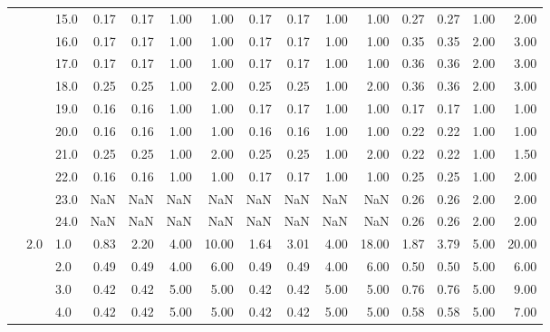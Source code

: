 \begin{tabular}{lllrrrrrrrrrrrr}
       &     & 15.0 &       0.17 &      0.17 & 1.00 &   1.00 &       0.17 &      0.17 &  1.00 &   1.00 &       0.27 &      0.27 &  1.00 &   2.00 \\
       &     & 16.0 &       0.17 &      0.17 & 1.00 &   1.00 &       0.17 &      0.17 &  1.00 &   1.00 &       0.35 &      0.35 &  2.00 &   3.00 \\
       &     & 17.0 &       0.17 &      0.17 & 1.00 &   1.00 &       0.17 &      0.17 &  1.00 &   1.00 &       0.36 &      0.36 &  2.00 &   3.00 \\
       &     & 18.0 &       0.25 &      0.25 & 1.00 &   2.00 &       0.25 &      0.25 &  1.00 &   2.00 &       0.36 &      0.36 &  2.00 &   3.00 \\
       &     & 19.0 &       0.16 &      0.16 & 1.00 &   1.00 &       0.17 &      0.17 &  1.00 &   1.00 &       0.17 &      0.17 &  1.00 &   1.00 \\
       &     & 20.0 &       0.16 &      0.16 & 1.00 &   1.00 &       0.16 &      0.16 &  1.00 &   1.00 &       0.22 &      0.22 &  1.00 &   1.00 \\
       &     & 21.0 &       0.25 &      0.25 & 1.00 &   2.00 &       0.25 &      0.25 &  1.00 &   2.00 &       0.22 &      0.22 &  1.00 &   1.50 \\
       &     & 22.0 &       0.16 &      0.16 & 1.00 &   1.00 &       0.17 &      0.17 &  1.00 &   1.00 &       0.25 &      0.25 &  1.00 &   2.00 \\
       &     & 23.0 &        NaN &       NaN &  NaN &    NaN &        NaN &       NaN &   NaN &    NaN &       0.26 &      0.26 &  2.00 &   2.00 \\
       &     & 24.0 &        NaN &       NaN &  NaN &    NaN &        NaN &       NaN &   NaN &    NaN &       0.26 &      0.26 &  2.00 &   2.00 \\
       & 2.0 & 1.0  &       0.83 &      2.20 & 4.00 &  10.00 &       1.64 &      3.01 &  4.00 &  18.00 &       1.87 &      3.79 &  5.00 &  20.00 \\
       &     & 2.0  &       0.49 &      0.49 & 4.00 &   6.00 &       0.49 &      0.49 &  4.00 &   6.00 &       0.50 &      0.50 &  5.00 &   6.00 \\
       &     & 3.0  &       0.42 &      0.42 & 5.00 &   5.00 &       0.42 &      0.42 &  5.00 &   5.00 &       0.76 &      0.76 &  5.00 &   9.00 \\
       &     & 4.0  &       0.42 &      0.42 & 5.00 &   5.00 &       0.42 &      0.42 &  5.00 &   5.00 &       0.58 &      0.58 &  5.00 &   7.00 \\

\end{tabular}
